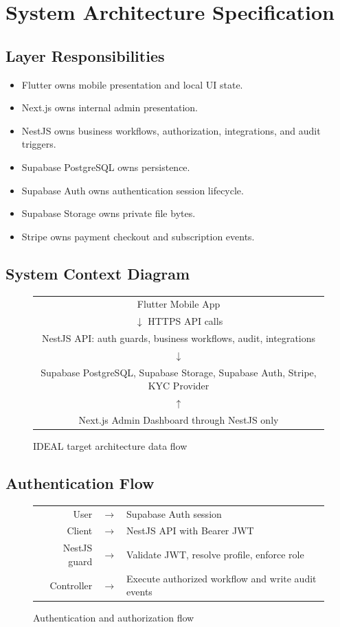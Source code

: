 \chapter{System Architecture Specification}
\section{Layer Responsibilities}
\begin{itemize}
  \item Flutter owns mobile presentation and local UI state.
  \item Next.js owns internal admin presentation.
  \item NestJS owns business workflows, authorization, integrations, and audit triggers.
  \item Supabase PostgreSQL owns persistence.
  \item Supabase Auth owns authentication session lifecycle.
  \item Supabase Storage owns private file bytes.
  \item Stripe owns payment checkout and subscription events.
\end{itemize}

\section{System Context Diagram}
\begin{figure}[H]
\centering
\begin{tabular}{c}
Flutter Mobile App \\
$\downarrow$ HTTPS API calls \\
NestJS API: auth guards, business workflows, audit, integrations \\
$\downarrow$ \\
Supabase PostgreSQL, Supabase Storage, Supabase Auth, Stripe, KYC Provider \\
$\uparrow$ \\
Next.js Admin Dashboard through NestJS only
\end{tabular}
\caption{IDEAL target architecture data flow}
\end{figure}

\section{Authentication Flow}
\begin{figure}[H]
\centering
\begin{tabular}{rcl}
User & $\rightarrow$ & Supabase Auth session \\
Client & $\rightarrow$ & NestJS API with Bearer JWT \\
NestJS guard & $\rightarrow$ & Validate JWT, resolve profile, enforce role \\
Controller & $\rightarrow$ & Execute authorized workflow and write audit events
\end{tabular}
\caption{Authentication and authorization flow}
\end{figure}
